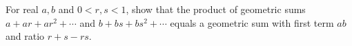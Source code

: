 For real $a,b$ and $0<r,s<1$, show that the product of geometric sums $a+ar+ar^2+\cdots$ and $b+bs+bs^2+\cdots$ equals a geometric sum with first term $ab$ and ratio $r+s-rs$.
